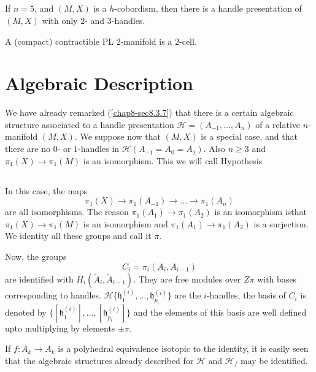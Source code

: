 \subsection{}\label{chap8-sec8.8.3}
If $n=5$, and $(M,X)$ is a $h$-cobordism, then there is a handle presentation of $(M,X)$ with only $2$- and $3$-handles.

\setcounter{proposition}{3}
\begin{ex}
A (compact) contractible PL $2$-manifold is a $2$-cell.
\end{ex}

\section{Algebraic Description}\label{chap8-sec8.9}

We have already remarked (\ref{chap8-sec8.3.7}) that there is a certain algebraic structure associated to a handle presentation $\mathscr{H}=(A_{-1},\ldots,A_{n})$ of a relative $n$-manifold $(M,X)$. We suppose now that $(M,X)$ is a special case, and that there are no $0$- or $1$-handles in $\mathscr{H}(A_{-1}=A_{0}=A_{1})$. Also $n\geq 3$ and $\pi_{1}(X)\to \pi_{1}(M)$ is an isomorphism. This we will call Hypothesis 

\subsection{}\label{chap8-sec8.9.1}
 In this case, the maps
\begin{equation*}
\pi_{1}(X)\to \pi_{1}(A_{-1})\to \ldots\to \pi_{1}(A_{n})  
\end{equation*}
are all isomorphisms. The reason $\pi_{1}(A_{1})\to \pi_{1}(A_{2})$ is an isomorphism is\pageoriginale that $\pi_{1}(X)\to \pi_{1}(M)$ is an isomorphism and $\pi_{1}(A_{1})\to \pi_{1}(A_{2})$ is a surjection. We identity all these groups and call it $\pi$.

Now, the groups
$$
C_{i}=\pi_{i}(A_{i},A_{i-1})
$$
are identified with $H_{i}(\tilde{A}_{i},\tilde{A}_{i-1})$. They are free modules over $Z\pi$ with bases corresponding to handles. $\mathscr{H}\{\mathfrak{h}^{(i)}_{1},\ldots,\mathfrak{h}^{(i)}_{p_{i}}\}$ are the $i$-handles, the basis of $C_{i}$ is denoted by $\{[\mathfrak{h}^{(i)}_{1}],\ldots,[\mathfrak{h}^{(i)}_{p_{i}}]\}$ and the elements of this basis are well defined upto multiplying by elements $\pm \pi$.

If $f:A_{k}\to A_{k}$ is a polyhedral equivalence isotopic to the identity, it is easily seen that the algebraic structures already described for $\mathscr{H}$ and $\mathscr{H}_{f}$ may be identified.

